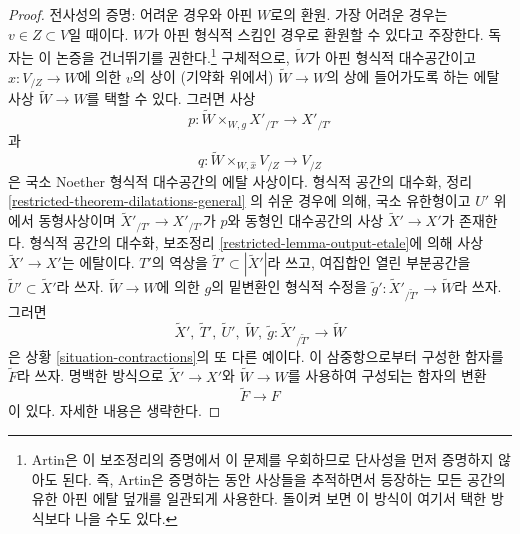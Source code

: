\begin{proof}
\medskip\noindent
전사성의 증명: 어려운 경우와 아핀 $W$로의 환원.
가장 어려운 경우는 $v \in Z \subset V$일 때이다.
$W$가 아핀 형식적 스킴인 경우로 환원할 수 있다고 주장한다.
독자는 이 논증을 건너뛰기를 권한다.\footnote{Artin은 이 보조정리의
증명에서 이 문제를 우회하므로 단사성을 먼저 증명하지 않아도 된다.
즉, Artin은 증명하는 동안 사상들을 추적하면서 등장하는 모든 공간의
유한 아핀 에탈 덮개를 일관되게 사용한다.
돌이켜 보면 이 방식이 여기서 택한 방식보다 나을 수도 있다.}
구체적으로, $\tilde W$가 아핀 형식적 대수공간이고
$\hat x : V_{/Z} \to W$에 의한 $v$의 상이 (기약화 위에서)
$\tilde W \to W$의 상에 들어가도록 하는 에탈 사상
$\tilde W \to W$를 택할 수 있다. 그러면 사상
$$
p : \tilde W \times_{W, g} X'_{/T'} \longrightarrow X'_{/T'}
$$
과
$$
q : \tilde W \times_{W, \hat x} V_{/Z} \to V_{/Z}
$$
은 국소 Noether 형식적 대수공간의 에탈 사상이다.
형식적 공간의 대수화, 정리
\ref{restricted-theorem-dilatations-general}
의 쉬운 경우에 의해, 국소 유한형이고 $U'$ 위에서 동형사상이며
$\tilde X'_{/T'} \to X'_{/T'}$가 $p$와 동형인 대수공간의 사상
$\tilde X' \to X'$가 존재한다.
형식적 공간의 대수화, 보조정리 \ref{restricted-lemma-output-etale}에 의해
사상 $\tilde X' \to X'$는 에탈이다.
$T'$의 역상을 $\tilde T' \subset |\tilde X'|$라 쓰고,
여집합인 열린 부분공간을 $\tilde U' \subset \tilde X'$라 쓰자.
$\tilde W \to W$에 의한 $g$의 밑변환인 형식적 수정을
$\tilde g' : \tilde X'_{/\tilde T'} \to \tilde W$라 쓰자.
그러면
$$
\tilde X',\ \tilde T',\ \tilde U',\ \tilde W,
\ \tilde g : \tilde X'_{/\tilde T'} \to \tilde W
$$
은 상황 \ref{situation-contractions}의 또 다른 예이다.
이 삼중항으로부터 구성한 함자를 $\tilde F$라 쓰자. 명백한 방식으로
$\tilde X' \to X'$와 $\tilde W \to W$를 사용하여 구성되는 함자의 변환
$$
\tilde F \longrightarrow F
$$
이 있다. 자세한 내용은 생략한다.


\end{proof}
